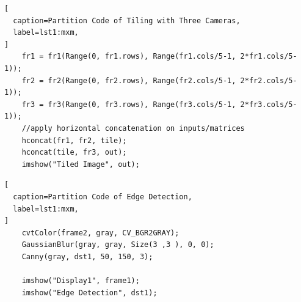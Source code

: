 \documentclass[letterpaper,10pt,serif,draftclsnofoot,onecolumn,compsoc,titlepage]{IEEEtran}
\begin{document}
\begin{lstlisting}[
  caption=Partition Code of Tiling with Three Cameras,
  label=lst1:mxm,
]
	fr1 = fr1(Range(0, fr1.rows), Range(fr1.cols/5-1, 2*fr1.cols/5-1));
	fr2 = fr2(Range(0, fr2.rows), Range(fr2.cols/5-1, 2*fr2.cols/5-1));
	fr3 = fr3(Range(0, fr3.rows), Range(fr3.cols/5-1, 2*fr3.cols/5-1));
	//apply horizontal concatenation on inputs/matrices
	hconcat(fr1, fr2, tile);        	
	hconcat(tile, fr3, out);
    imshow("Tiled Image", out);
\end{lstlisting}

\begin{lstlisting}[
  caption=Partition Code of Edge Detection,
  label=lst1:mxm,
]
	cvtColor(frame2, gray, CV_BGR2GRAY);
	GaussianBlur(gray, gray, Size(3 ,3 ), 0, 0);
	Canny(gray, dst1, 50, 150, 3);
		
	imshow("Display1", frame1);
	imshow("Edge Detection", dst1);
\end{lstlisting}

\nocite{*}
\newpage


\end{document}

